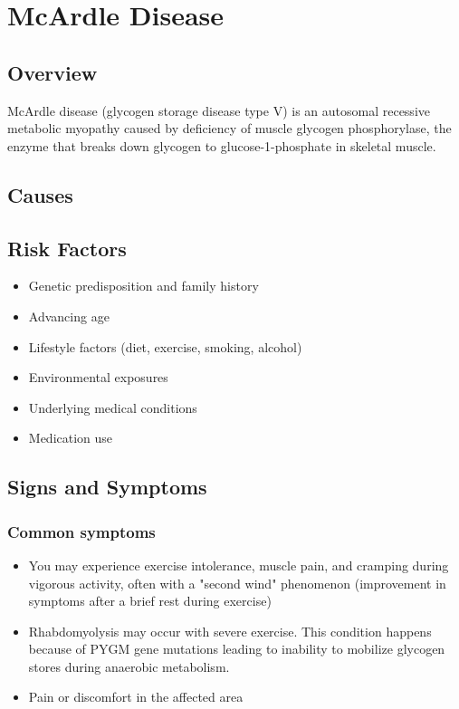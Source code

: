 \chapter{McArdle Disease}
\label{sec:McArdle Disease}

\section{Overview}
McArdle disease (glycogen storage disease type V) is an autosomal recessive metabolic myopathy caused by deficiency of muscle glycogen phosphorylase, the enzyme that breaks down glycogen to glucose-1-phosphate in skeletal muscle.
\section{Causes}
\section{Risk Factors}

\begin{itemize}[noitemsep]
  \item Genetic predisposition and family history
  \item Advancing age
  \item Lifestyle factors (diet, exercise, smoking, alcohol)
  \item Environmental exposures
  \item Underlying medical conditions
  \item Medication use
\end{itemize}
\section{Signs and Symptoms}

\subsection{Common symptoms}
\begin{itemize}[noitemsep]
  \item You may experience exercise intolerance, muscle pain, and cramping during vigorous activity, often with a "second wind" phenomenon (improvement in symptoms after a brief rest during exercise)
  \item Rhabdomyolysis may occur with severe exercise. This condition happens because of PYGM gene mutations leading to inability to mobilize glycogen stores during anaerobic metabolism.
  \item Pain or discomfort in the affected area
  \end{itemize}

